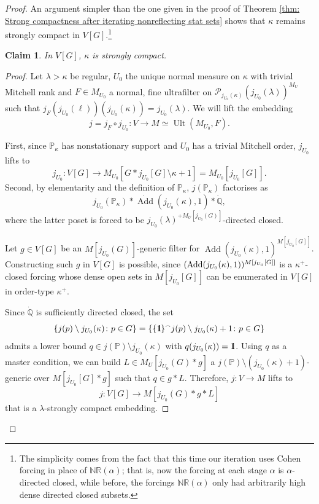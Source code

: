 \documentclass[11pt]{amsart}
\newtheorem{claim}{Claim}[theorem]
\theoremstyle{definition}
\newcounter{condition}
\theoremstyle{remark}
\newcommand\<{{<}}
\DeclareMathOperator{\Add}{Add}
\DeclareMathOperator{\Ult}{Ult}
\newcommand{\one}{\mathop{1\hskip-3pt {\rm l}}}
\newcommand{\po}{\mathbb{P}}
\newcommand{\qo}{\mathbb{Q}}
\begin{document}
\begin{proof}
An argument simpler than the one given in the proof of Theorem \ref{thm: Strong compactness after iterating nonreflecting stat sets} shows that $\kappa$ remains strongly compact in $V[G]$.\footnote{The simplicity comes from the fact that this time our iteration uses Cohen forcing in place of $\mathbb{NR}(\alpha)$; that is, now the forcing at each stage $\alpha$ is $\alpha$-directed closed, while before, the forcings $\mathbb{NR}(\alpha)$ only had arbitrarily high dense directed closed subsets.}


\begin{claim}
In $V[G]$, $\kappa$ is strongly compact.    
\end{claim}
\begin{proof}
   Let $\lambda>\kappa$ be regular,  $U_0$  the unique normal measure on $\kappa$ with trivial Mitchell rank and $F\in M_{U_0}$ a normal, fine ultrafilter on $\mathcal{P}_{j_{U_0}(\kappa)}(j_{U_0}(\lambda))^{M_U}$ such that $j_{F}(j_{U_0}(\ell))(j_{U_0}(\kappa))=j_{U_0}(\lambda).$
   We will lift the  embedding $$j=j_{F}\circ j_{U_0}\colon V\to M\simeq \Ult(M_{U_0}, F).$$
   
   First, since $\mathbb{P}_\kappa$ has nonstationary support and $U_0$ has a trivial Mitchell order, $j_{U_0}$ lifts to 
   $$j_{U_0}\colon V[G]\rightarrow M_{U_0}[G\ast j_{U_0}[G]\setminus \kappa+1]=M_{U_0}[j_{U_0}[G]].$$
   Second, by elementarity and the definition of $\mathbb{P}_\kappa$, $j(\mathbb{P}_\kappa)$ factorises as $$j_{U_0}(\mathbb{P}_\kappa)\ast \dot{\Add}(j_{U_0}(\kappa), 1)\ast \dot{\mathbb{Q}},$$
   where the latter poset is forced to be $j_{U_0}(\lambda)^{+M_U[j_{U_0}(G)]}$-directed closed.

   Let $g\in V[G]$ be an $M[j_{U_0}(G)]$-generic filter for $\Add(j_{U_0}(\kappa), 1)^{M[j_{U_0}[G]]}$. Constructing such $g$ in $V[G]$ is possible, since $({\rm{Add}}(j_{U_0}(\kappa),1))^{M[ j_{U_0}[G] ]}$ is a $\kappa^+$-closed forcing whose dense open sets in $M[j_{U_0}[G]]$ can be enumerated in $V[G]$ in order-type $\kappa^+$.

  Since $\dot{\qo}$ is sufficiently directed closed, the set $$\{j(p)\setminus j_{U_0}(\kappa)\colon p\in G\}=\{\{\one\}^\smallfrown j(p)\setminus j_{U_0}(\kappa)+1\colon p\in G\}$$
  admits a lower bound $q\in j(\po)\setminus j_{U_0}(\kappa)$ with $q(j_{U_0}(\kappa)) = \one$. Using $q$ as a master condition, we can build $L\in M_U[j_{U_0}(G)\ast g]$ a $j(\po)\setminus (j_{U_0}(\kappa)+1)$-generic over $M[j_{U_0}[G]\ast g]$ such that $q\in g*L$. Therefore, $j\colon V\to M$ lifts to
  $$j\colon V[G]\rightarrow M[j_{U_0}(G)\ast g\ast L]$$
  that is a $\lambda$-strongly compact embedding.
\end{proof}


\end{proof}
\end{document}
